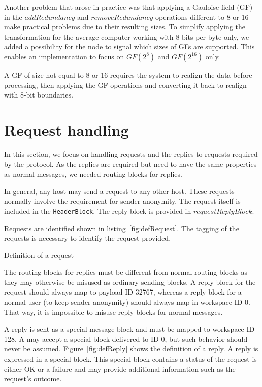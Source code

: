 Another problem that arose in practice was that applying a Gauloise field (GF) in the $addRedundancy$ and $removeRedundancy$ operations different to 8 or 16 make practical problems due to their resulting sizes. To simplify applying the transformation for the average computer working with 8 bits per byte only, we added a possibility for the node to signal which sizes of GFs are supported. This enables an implementation to focus on $GF(2^8)$ and $GF(2^{16})$ only.

A GF of size not equal to 8 or 16 requires the system to realign the data before processing, then applying the GF operations and converting it back to realign with 8-bit boundaries.

\section{Request handling}
In this section, we focus on handling requests and the replies to requests required by the protocol. As the replies are required but need to have the same properties as normal messages, we needed routing blocks for replies.

In general, any host may send a request to any other host. These requests normally involve the requirement for sender anonymity. The request itself is included in the \lstinline[columns=fixed,basicstyle=\normalsize]{HeaderBlock}. The reply block is provided in $requestReplyBlock$.

Requests are identified shown in listing~\ref{fig:defRequest}. The tagging of the requests is necessary to identify the request provided.

\begin{lstfloat}[ht]
	
	\caption{Definition of a request}
	\label{fig:defRequest}
\end{lstfloat}

The routing blocks for replies must be different from normal routing blocks as they may otherwise be misused as ordinary sending blocks. A reply block for the request should always map to payload ID 32767, whereas a reply block for a normal user (to keep sender anonymity) should always map in workspace ID 0. That way, it is impossible to misuse reply blocks for normal messages.

A reply is sent as a special message block and must be mapped to workspace ID 128. A \VortexNode{} may accept a special block delivered to ID 0, but such behavior should never be assumed. Figure~\ref{fig:defReply} shows the definition of a reply. A reply is expressed in a special block. This special block contains a status of the request is either OK or a failure and may provide additional information such as the request's outcome.

